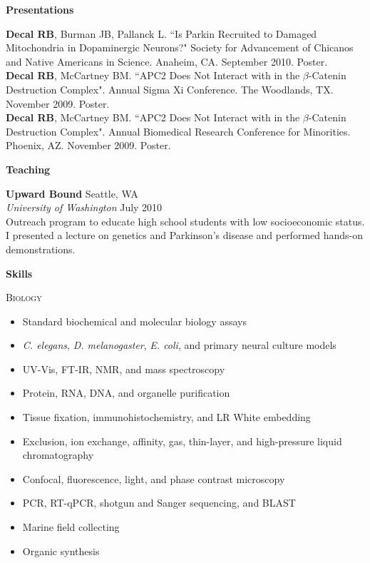 \documentclass[a4paper,12pt]{article}
\newcommand{\resheading}[1]{{\vspace*{.06in} \colorbox{mygrey}{\begin{minipage}{\textwidth}{\textmd{\large \textbf{#1} \vphantom{p\^{E}}}}\end{minipage}}} }
\newcommand{\ressubheading}[4]{
        \textbf{#1} \hfill #2\\
        \textit{#3} \hfill #4 \\}
\begin{document}
\resheading{Presentations}
    
    \textbf{Decal RB}, Burman JB, Pallanck L. ``Is Parkin Recruited to Damaged Mitochondria in Dopaminergic Neurons?" Society for Advancement of Chicanos and Native Americans in Science.  Anaheim, CA. September 2010. Poster.\\

    \textbf{Decal RB}, McCartney BM. ``APC2 Does Not Interact with in the $\beta$-Catenin Destruction Complex". Annual Sigma Xi Conference. The Woodlands, TX. November 2009. Poster.\\

    \textbf{Decal RB}, McCartney BM. ``APC2 Does Not Interact with in the $\beta$-Catenin Destruction Complex". Annual Biomedical Research Conference for Minorities. Phoenix, AZ. November 2009. Poster.\\
        
\resheading{Teaching}

    \ressubheading{Upward Bound}{Seattle, WA}{University of Washington}{July 2010}
    Outreach program to educate high school students with low socioeconomic status. I presented a lecture on genetics and Parkinson's disease and performed hands-on demonstrations.\\        
        
\resheading{Skills}

     \textsc{Biology}\vspace*{-15pt}
        \begin{multicols}{2} \begin{itemize}[leftmargin=0.4cm] 
        \item Standard biochemical and molecular biology assays
        \item \textit{C. elegans}, \textit{D. melanogaster}, \textit{E. coli}, and primary neural culture models
        \item UV-Vis, FT-IR, NMR, and mass spectroscopy
        \item Protein, RNA, DNA, and organelle purification
        \item Tissue fixation, immunohistochemistry, and LR White embedding
        \item Exclusion, ion exchange, affinity, gas, thin-layer, and high-pressure liquid chromatography
        \item Confocal, fluorescence, light, and phase contrast microscopy
        \item PCR, RT-qPCR, shotgun and Sanger sequencing, and BLAST
        \item Marine field collecting
        \item Organic synthesis
        \end{itemize}
        \end{multicols}
\end{document}
